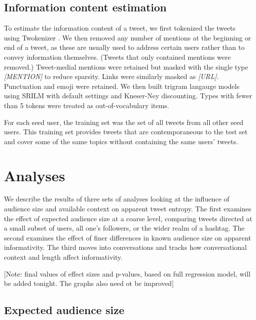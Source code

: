 \documentclass[11pt,letterpaper]{article}
\begin{document}
\subsection{Information content estimation}

To estimate the information content of a tweet, we first tokenized the tweets using Twokenizer \cite{owoputi2013}. We then removed any number of mentions at the beginning or end of a tweet, as these are usually used to address certain users rather than to convey information themselves. (Tweets that only contained mentions were removed.)  Tweet-medial mentions were retained but masked with the single type {\it [MENTION]} to reduce sparsity. Links were similarly masked as {\it [URL]}. Punctuation and emoji were retained. We then built trigram langauge models using SRILM with default settings and Kneser-Ney discounting.  Types with fewer than 5 tokens were treated as out-of-vocabulary items. 

For each seed user, the training set was the set of all tweets from all other seed users.  This training set provides tweets that are contemporaneous to the test set and cover some of the same topics without containing the same users' tweets.

\section{Analyses}

We describe the results of three sets of analyses looking at the influence of audience size and available context on apparent tweet entropy. The first examines the effect of expected audience size at a coarse level, comparing tweets directed at a small subset of users, all one's followers, or the wider realm of a hashtag.   The second examines the effect of finer differences in known audience size on apparent informativity.  The third moves into conversations and tracks how conversational context and length affect informativity.

[Note: final values of effect sizes and p-values, based on full regression model, will be added tonight. The graphs also need ot be improved]

\subsection{Expected audience size}
\label{sec:expected}
\end{document}
